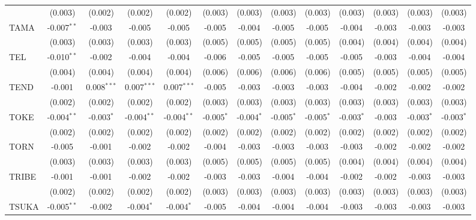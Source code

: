 \begin{table}[!htbp]
\begin{tabular}{@{\extracolsep{5pt}}lcccccccccccc}
  & (0.003) & (0.002) & (0.002) & (0.002) & (0.003) & (0.003) & (0.003) & (0.003) & (0.003) & (0.003) & (0.003) & (0.003) \\
 TAMA & -0.007$^{**}$ & -0.003$^{}$ & -0.005$^{}$ & -0.005$^{}$ & -0.005$^{}$ & -0.004$^{}$ & -0.005$^{}$ & -0.005$^{}$ & -0.004$^{}$ & -0.003$^{}$ & -0.003$^{}$ & -0.003$^{}$ \\
  & (0.003) & (0.003) & (0.003) & (0.003) & (0.005) & (0.005) & (0.005) & (0.005) & (0.004) & (0.004) & (0.004) & (0.004) \\
 TEL & -0.010$^{**}$ & -0.002$^{}$ & -0.004$^{}$ & -0.004$^{}$ & -0.006$^{}$ & -0.005$^{}$ & -0.005$^{}$ & -0.005$^{}$ & -0.005$^{}$ & -0.003$^{}$ & -0.004$^{}$ & -0.004$^{}$ \\
  & (0.004) & (0.004) & (0.004) & (0.004) & (0.006) & (0.006) & (0.006) & (0.006) & (0.005) & (0.005) & (0.005) & (0.005) \\
 TEND & -0.001$^{}$ & 0.008$^{***}$ & 0.007$^{***}$ & 0.007$^{***}$ & -0.005$^{}$ & -0.003$^{}$ & -0.003$^{}$ & -0.003$^{}$ & -0.004$^{}$ & -0.002$^{}$ & -0.002$^{}$ & -0.002$^{}$ \\
  & (0.002) & (0.002) & (0.002) & (0.002) & (0.003) & (0.003) & (0.003) & (0.003) & (0.003) & (0.003) & (0.003) & (0.003) \\
 TOKE & -0.004$^{**}$ & -0.003$^{*}$ & -0.004$^{**}$ & -0.004$^{**}$ & -0.005$^{*}$ & -0.004$^{*}$ & -0.005$^{*}$ & -0.005$^{*}$ & -0.003$^{*}$ & -0.003$^{}$ & -0.003$^{*}$ & -0.003$^{*}$ \\
  & (0.002) & (0.002) & (0.002) & (0.002) & (0.002) & (0.002) & (0.002) & (0.002) & (0.002) & (0.002) & (0.002) & (0.002) \\
 TORN & -0.005$^{}$ & -0.001$^{}$ & -0.002$^{}$ & -0.002$^{}$ & -0.004$^{}$ & -0.003$^{}$ & -0.003$^{}$ & -0.003$^{}$ & -0.003$^{}$ & -0.002$^{}$ & -0.002$^{}$ & -0.002$^{}$ \\
  & (0.003) & (0.003) & (0.003) & (0.003) & (0.005) & (0.005) & (0.005) & (0.005) & (0.004) & (0.004) & (0.004) & (0.004) \\
 TRIBE & -0.001$^{}$ & -0.001$^{}$ & -0.002$^{}$ & -0.002$^{}$ & -0.003$^{}$ & -0.003$^{}$ & -0.004$^{}$ & -0.004$^{}$ & -0.002$^{}$ & -0.002$^{}$ & -0.003$^{}$ & -0.003$^{}$ \\
  & (0.002) & (0.002) & (0.002) & (0.002) & (0.003) & (0.003) & (0.003) & (0.003) & (0.003) & (0.003) & (0.003) & (0.003) \\
 TSUKA & -0.005$^{**}$ & -0.002$^{}$ & -0.004$^{*}$ & -0.004$^{*}$ & -0.005$^{}$ & -0.004$^{}$ & -0.004$^{}$ & -0.004$^{}$ & -0.003$^{}$ & -0.003$^{}$ & -0.003$^{}$ & -0.003$^{}$ \\

\end{tabular}
\end{table}
